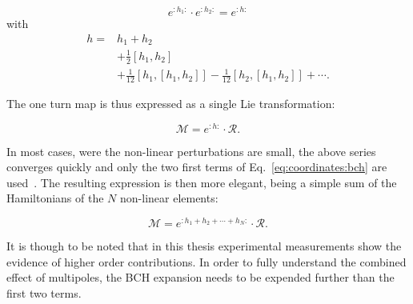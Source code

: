 \begin{equation}
    e^{:h_1:} \cdot e^{:h_2:} = e^{:h:}
\end{equation}
with 
\begin{equation}
    \begin{aligned}
        h =& h_1 + h_2 \\
           & + \frac{1}{2} [h_1, h_2] \\
           & + \frac{1}{12} [h_1, [h_1, h_2]] - \frac{1}{12} [h_2, [h_1, h_2]] + \cdots.
    \end{aligned}
    \label{eq:coordinates:bch}
\end{equation}

The one turn map is thus expressed as a single Lie transformation:

\begin{equation}
    \mathcal{M} = e^{:h:} \cdot \mathcal{R}.
\end{equation}

In most cases, were the non-linear perturbations are small, the above series converges quickly
and only the two first terms of Eq.~\eqref{eq:coordinates:bch} are
used~\cite{carlier_nonlinear_2020-1}. The resulting expression is then more elegant, being a simple
sum of the Hamiltonians of the $N$ non-linear elements:

\begin{equation}
   \mathcal{M} = e^{:h_1 + h_2 + \cdots + h_N:} \cdot \mathcal{R}.
\end{equation}

It is though to be noted that in this thesis experimental measurements show the evidence of higher
order contributions. In order to fully understand the combined effect of multipoles, the BCH
expansion needs to be expended further than the first two terms.